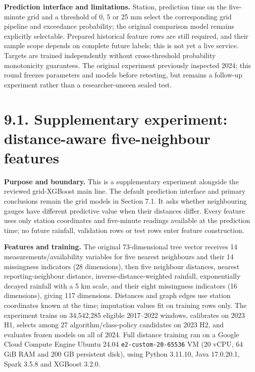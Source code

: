 \documentclass[UTF8,fontset=fandol,10pt,a4paper,landscape]{ctexart}
\begin{document}
\textbf{Prediction interface and limitations.} Station, prediction time on the five-minute grid and a threshold of 0, 5 or 25 mm select the corresponding grid pipeline and exceedance probability; the original comparison model remains explicitly selectable. Prepared historical feature rows are still required, and their sample scope depends on complete future labels; this is not yet a live service. Targets are trained independently without cross-threshold probability monotonicity guarantees. The original experiment previously inspected 2024; this round freezes parameters and models before retesting, but remains a follow-up experiment rather than a researcher-unseen sealed test.



\clearpage
\section*{9.1. Supplementary experiment: distance-aware five-neighbour features}

\textbf{Purpose and boundary.} This is a supplementary experiment alongside the reviewed grid-XGBoost main line. The default prediction interface and primary conclusions remain the grid models in Section 7.1. It asks whether neighbouring gauges have different predictive value when their distances differ. Every feature uses only station coordinates and five-minute readings available at the prediction time; no future rainfall, validation rows or test rows enter feature construction.

\textbf{Features and training.} The original 73-dimensional tree vector receives 14 measurements/availability variables for five nearest neighbours and their 14 missingness indicators (28 dimensions), then five neighbour distances, nearest reporting-neighbour distance, inverse-distance-weighted rainfall, exponentially decayed rainfall with a 5 km scale, and their eight missingness indicators (16 dimensions), giving 117 dimensions. Distances and graph edges use station coordinates known at the time; imputation values fit on training rows only. The experiment trains on 34,542,285 eligible 2017--2022 windows, calibrates on 2023 H1, selects among 27 algorithm/class-policy candidates on 2023 H2, and evaluates frozen models on all of 2024. Full distance training ran on a Google Cloud Compute Engine Ubuntu 24.04 \texttt{e2-custom-20-65536} VM (20 vCPU, 64 GiB RAM and 200 GB persistent disk), using Python 3.11.10, Java 17.0.20.1, Spark 3.5.8 and XGBoost 3.2.0.
\end{document}
